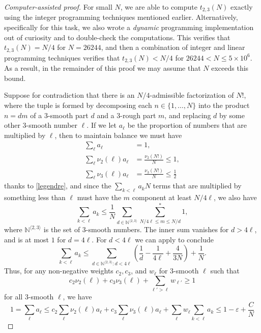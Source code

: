 \documentclass[10pt,a4paper,reqno]{amsart}
\numberwithin{equation}{section}
\theoremstyle{plain}
\theoremstyle{definition}
\newcommand\N{\mathbb{N}}
\newcommand\eps{\varepsilon}
\begin{document}
\begin{proof}[Computer-assisted proof]
For small $N$, we are able to compute $t_{2,3}(N)$ exactly using the integer programming techniques mentioned earlier.
Alternatively, specifically for this task, we also wrote a \emph{dynamic} programming implementation out of curiosity and to double-check the computations.
This verifies that $t_{2,3}(N)=N/4$ for $N=26244$, and then a combination of integer and linear programming techniques verifies that $t_{2,3}(N) < N/4$ for $26244 < N \le 5\times 10^6$.
As a result, in the remainder of this proof we may assume that $N$ exceeds this bound.

Suppose for contradiction that there is an $N/4$-admissible factorization of $N!$, where the tuple is formed by decomposing each $n \in \{1,\dots,N\}$ into the product $n=dm$ of a $3$-smooth part $d$ and a $3$-rough part $m$, and replacing $d$ by some other $3$-smooth number $\ell$.  If we let $a_\ell$ be the proportion of numbers that are multiplied by $\ell$, then to maintain balance we must have
  \begin{align*}
    \sum_\ell a_\ell &= 1, \\
    \sum_\ell \nu_2(\ell) a_\ell &= \frac{\nu_2(N!)}{N} \leq 1, \\
    \sum_\ell \nu_3(\ell) a_\ell &= \frac{\nu_3(N!)}{N} \leq \frac{1}{2}
  \end{align*}
  thanks to \eqref{legendre}, and since the $\sum_{k < \ell} a_k N$ terms that are multiplied by something less than $\ell$ must have the $m$ component at least $N/4\ell$, we also have
  $$ \sum_{k < \ell} a_k \leq \frac{1}{N} \sum_{d \in \N^{\langle 2,3 \rangle}} \sum^*_{N/4\ell \leq m \leq N/d} 1,$$
  where $\N^{\langle 2,3 \rangle}$ is the set of $3$-smooth numbers.
  The inner sum vanishes for $d > 4\ell$, and is at most $1$ for $d = 4\ell$.  For $d < 4\ell$ we can apply  to conclude
  $$ \sum_{k < \ell} a_k \leq \sum_{d \in \N^{\langle 2,3 \rangle}: d < 4\ell} \left(\frac{1}{d}-\frac{1}{4\ell} + \frac{4}{3N}\right) + \frac{1}{N}.$$
  Thus, for any non-negative weights $c_2, c_3$, and $w_\ell$ for $3$-smooth $\ell$ such that
  \begin{equation}\label{ell-cond}
     c_2 \nu_2(\ell) + c_3 \nu_3(\ell) + \sum_{\ell' > \ell} w_{\ell'} \geq 1
  \end{equation}
  for all $3$-smooth $\ell$, we have
  $$  1= \sum_\ell a_\ell \leq c_2 \sum_\ell \nu_2(\ell) a_\ell + c_3 \sum_\ell \nu_3(\ell) a_\ell + \sum_{\ell} w_\ell \sum_{k < \ell} a_k \leq 1 - \eps  + \frac{C}{N}
  $$

\end{proof}
\end{document}
